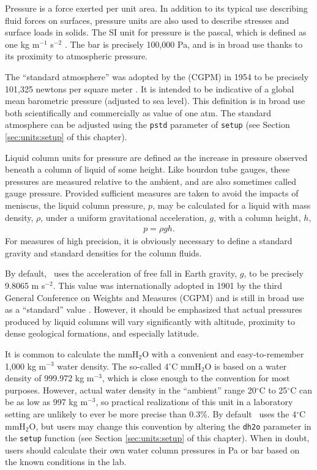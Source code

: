 Pressure is a force exerted per unit area.  In addition to its typical use describing fluid forces on surfaces, pressure units are also used to describe stresses and surface loads in solids.  The SI unit for pressure is the pascal, which is defined as one kg m$^{-1}$ s$^{-2}$ \cite[p.137]{si:2019}.  The bar is precisely 100,000 Pa, and is in broad use thanks to its proximity to atmospheric pressure. 

The ``standard atmosphere'' was adopted by the (CGPM) in 1954 to be precisely 101,325 newtons per square meter \cite{cgpm:10:4}.  It is intended to be indicative of a global mean barometric pressure (adjusted to sea level).  This definition is in broad use both scientifically \cite{crc} and commercially \cite{nist:sp811} as value of one atm.  The standard atmosphere can be adjusted using the \verb|pstd| parameter of \verb|setup| (see Section \ref{sec:units:setup} of this chapter).

Liquid column units for pressure are defined as the increase in pressure observed beneath a column of liquid of some height.  Like bourdon tube gauges, these pressures are measured relative to the ambient, and are also sometimes called gauge pressure.  Provided sufficient measures are taken to avoid the impacts of meniscus, the liquid column pressure, $p$, may be calculated for a liquid with mass density, $\rho$, under a uniform gravitational acceleration, $g$, with a column height, $h$,
\begin{align}
p = \rho g h.
\end{align}
For measures of high precision, it is obviously necessary to define a standard gravity and standard densities for the column fluids.

By default, \PM\ uses the acceleration of free fall in Earth gravity, $g$, to be precisely 9.8065 m s$^{-2}$.  This value was internationally adopted in 1901 by the third General Conference on Weights and Measures (CGPM)\cite{cgpm:3:2} and is still in broad use as a ``standard'' value \cite[p.45]{nist:sp1038} \cite[p.5]{nist:sp811}.  However, it should be emphasized that actual pressures produced by liquid columns will vary significantly with altitude, proximity to dense geological formations, and especially latitude.  

It is common to calculate the mmH$_2$O with a convenient and easy-to-remember 1,000 kg m$^{-3}$ water density.  The so-called 4$^\circ$C mmH$_2$O is based on a water density of 999.972 kg m$^{-3}$, which is close enough to the convention for most purposes.  However, actual water density in the ``ambient'' range 20$^\circ$C to 25$^\circ$C can be as low as 997 kg m$^{-3}$, so practical realizations of this unit in a laboratory setting are unlikely to ever be more precise than 0.3\%.  By default \PM\ uses the 4$^\circ$C mmH$_2$O, but users may change this convention by altering the \verb|dh2o| parameter in the \verb|setup| function (see Section \ref{sec:units:setup} of this chapter).  When in doubt, users should calculate their own water column pressures in Pa or bar based on the known conditions in the lab.

